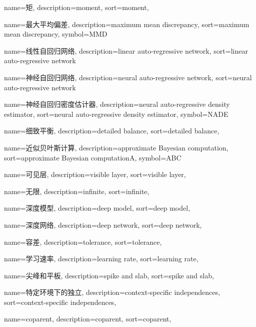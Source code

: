 {
  name=矩,
  description={moment},
  sort={moment},
}

{
  name=最大平均偏差,
  description={maximum mean discrepancy},
  sort={maximum mean discrepancy},
  symbol={MMD}
}

{
  name=线性自回归网络,
  description={linear auto-regressive network},
  sort={linear auto-regressive network}
}

{
  name=神经自回归网络,
  description={neural auto-regressive network},
  sort={neural auto-regressive network}
}

{
  name=神经自回归密度估计器,
  description={neural auto-regressive density estimator},
  sort={neural auto-regressive density estimator},
  symbol={NADE}
}

{
  name=细致平衡,
  description={detailed balance},
  sort={detailed balance},
}

{
  name=近似贝叶斯计算,
  description={approximate Bayesian computation},
  sort={approximate Bayesian computationA},
  symbol={ABC}
}

{
  name=可见层,
  description={visible layer},
  sort={visible layer},
}

{
  name=无限,
  description={infinite},
  sort={infinite},
}

{
  name=深度模型,
  description={deep model},
  sort={deep model},
}

{
  name=深度网络,
  description={deep network},
  sort={deep network},
}

{
  name=容差,
  description={tolerance},
  sort={tolerance},
}

{
  name=学习速率,
  description={learning rate},
  sort={learning rate},
}

{
  name=尖峰和平板,
  description={spike and slab},
  sort={spike and slab},
}

{
  name=特定环境下的独立,
  description={context-specific independences},
  sort={context-specific independences},
}

{
  name=coparent,
  description={coparent},
  sort={coparent},
}

